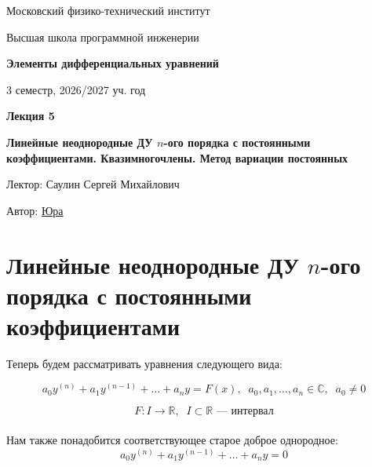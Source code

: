 \documentclass[11pt]{article}
\newcommand{\lectureNumber}{5}
\newcommand{\lectureTitle}{Линейные неоднородные ДУ $n$-ого порядка с постоянными коэффициентами. Квазимногочлены. Метод вариации постоянных}
\newcommand{\courseName}{Элементы дифференциальных уравнений}
\newcommand{\semester}{3 семестр, 2026/2027 уч. год}
\begin{document}
\begin{titlepage}
    \centering
    
    {\large Московский физико-технический институт \par}
    {\large Высшая школа программной инженерии \par}
    \vspace{2cm}

    {\Large \textbf{\courseName} \par}
    {\large \semester \par}
    
    \vspace*{\fill}

    {\Huge \textbf{Лекция \lectureNumber} \par}
    {\Huge \textbf{\lectureTitle} \par}
    
    \vspace*{\fill}
    
    {\large Лектор: Саулин Сергей Михайлович \par}
    {\large Автор: \href{https://t.me/ceagest}{Юра} \par}

\end{titlepage}


\section{Линейные неоднородные ДУ $n$-ого порядка с постоянными коэффициентами}

Теперь будем рассматривать уравнения следующего вида:

\begin{equation} \label{eq:1}
    a_0 y^{(n)} + a_1 y^{(n - 1)} + \ldots + a_n y = F(x), \; \; a_0, a_1, \ldots, a_n \in \mathbb{C}, \; \; a_0 \neq 0
\end{equation}

\begin{equation*}
    F \colon I \to \mathbb{R}, \; \; I \subset \mathbb{R} \text{ --- интервал}
\end{equation*} \leavevmode
\\
Нам также понадобится соответствующее старое доброе однородное:
\begin{equation} \label{eq:2}
    a_0 y^{(n)} + a_1 y^{(n - 1)} + \ldots + a_n y = 0
\end{equation}
\end{document}
